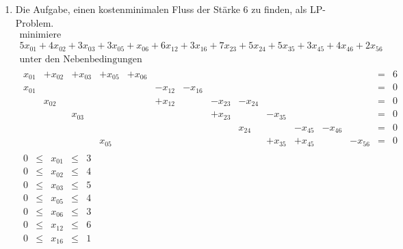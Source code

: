 \documentclass[a4paper]{scrartcl}
\begin{document}
\begin{enumerate}[label=\bfseries\arabic*.]
\begin{enumerate}
            \item Die Aufgabe, einen kostenminimalen Fluss der Stärke 6 zu
                finden, als LP-Problem.
                \begin{equation}
                    \begin{gathered}
                        \text{minimiere} \\
                        5x_{01} +4x_{02} +3x_{03} +3x_{05} +x_{06} +6x_{12} +3x_{16} +7x_{23} +5x_{24} +5x_{35} +3x_{45} +4x_{46} +2x_{56} \\
                        \text{unter den Nebenbedingungen} \\
                        \begin{array}{rrrrrrrrrrrrrcr}
                            x_{01} & +x_{02} & +x_{03} & +x_{05} & +x_{06} & & & & & & & & & = & 6 \\
                            x_{01} & & & & & -x_{12} & -x_{16} & & & & & & & = & 0 \\
                             & x_{02} & & & & +x_{12} & & -x_{23} & -x_{24} & & & & & = & 0 \\
                             & & x_{03} & & & & & +x_{23} & & -x_{35} & & & & = & 0 \\
                             & & & & & & & & x_{24} & & -x_{45} & -x_{46} & & = & 0 \\
                             & & & x_{05} & & & & & & +x_{35} & +x_{45} & & -x_{56} & = & 0
                        \end{array} \\
                        \begin{array}{rcrcr}
                            0 & \leq & x_{01} & \leq & 3 \\
                            0 & \leq & x_{02} & \leq & 4 \\
                            0 & \leq & x_{03} & \leq & 5 \\
                            0 & \leq & x_{05} & \leq & 4 \\
                            0 & \leq & x_{06} & \leq & 3 \\
                            0 & \leq & x_{12} & \leq & 6 \\
                            0 & \leq & x_{16} & \leq & 1 \\

\end{array}
\end{gathered}
\end{equation}
\end{enumerate}
\end{enumerate}
\end{document}
